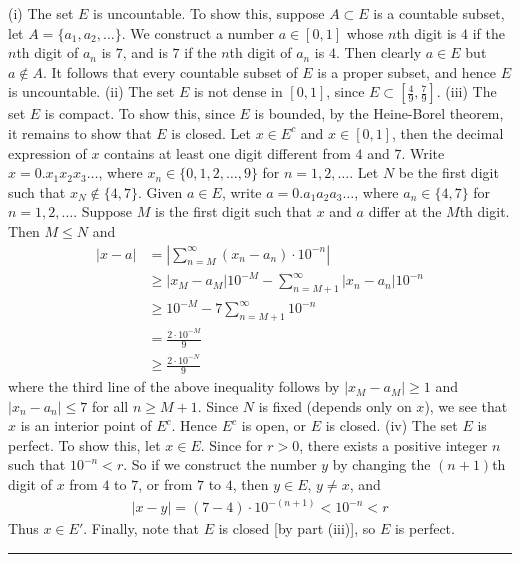 \documentclass[12pt]{article}
\theoremstyle{definition}
\begin{document}
(i) The set $E$ is uncountable. To show this, suppose $A\subset E$ is a countable subset, let $A=\{a_1,a_2,\ldots\}$. We construct a number $a\in[0,1]$ whose $n$th digit is $4$ if the $n$th digit of $a_n$ is $7$, and is $7$ if the $n$th digit of $a_n$ is $4$. Then clearly $a\in E$ but $a\notin A$. It follows that every countable subset of $E$ is a proper subset, and hence $E$ is uncountable.
(ii) The set $E$ is not dense in $[0,1]$, since $E\subset\left[\tfrac{4}{9},\tfrac{7}{9}\right]$.
(iii) The set $E$ is compact. To show this, since $E$ is bounded, by the Heine-Borel theorem, it remains to show that $E$ is closed. Let $x\in E^c$ and $x\in[0,1]$, then the decimal expression of $x$ contains at least one digit different from $4$ and $7$. Write $x=0.x_1x_2x_3\ldots$, where $x_n\in \{0,1,2,\ldots,9\}$ for $n=1,2,\ldots$. Let $N$ be the first digit such that $x_N\notin \{4,7\}$. Given $a\in E$, write $a=0.a_1a_2a_3\ldots$, where $a_n\in\{4,7\}$ for $n=1,2,\ldots$. Suppose $M$ is the first digit such that $x$ and $a$ differ at the $M$th digit. Then $M\le N$ and
\begin{align*}
\left\vert x-a\right\vert
&=\left\vert \sum_{n=M}^\infty(x_n-a_n)\cdot 10^{-n}\right\vert \\
&\ge\left\vert x_M-a_M\right\vert10^{-M}-\sum_{n=M+1}^\infty\left\vert x_n-a_n\right\vert 10^{-n} \\
&\ge 10^{-M}-7\sum_{n=M+1}^\infty 10^{-n} \\
&=\frac{2\cdot 10^{-M}}{9} \\
&\ge\frac{2\cdot 10^{-N}}{9}
\end{align*}
where the third line of the above inequality follows by $\left\vert x_M-a_M\right\vert\ge 1$ and $\left\vert x_n-a_n\right\vert\le 7$ for all $n\ge M+1$. Since $N$ is fixed (depends only on $x$), we see that $x$ is an interior point of $E^c$. Hence $E^c$ is open, or $E$ is closed.
(iv) The set $E$ is perfect. To show this, let $x\in E$. Since for $r>0$, there exists a positive integer $n$ such that $10^{-n}<r$. So if we construct the number $y$ by changing the $(n+1)$th digit of $x$ from $4$ to $7$, or from $7$ to $4$, then $y\in E$, $y\ne x$, and
\begin{align*}
\left\vert x-y\right\vert=(7-4)\cdot 10^{-(n+1)}
<10^{-n}
<r
\end{align*}
Thus $x\in E'$. Finally, note that $E$ is closed [by part (iii)], so $E$ is perfect.



\bigskip\noindent\hrule\bigskip
\end{document}
